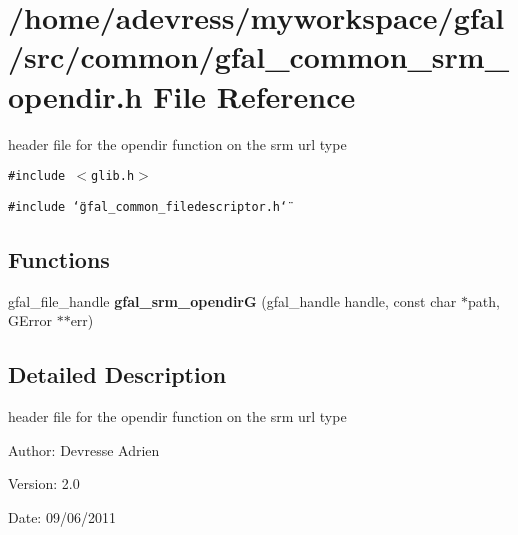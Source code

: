 \section{/home/adevress/myworkspace/gfal/src/common/gfal\_\-common\_\-srm\_\-opendir.h File Reference}
\label{gfal__common__srm__opendir_8h}
header file for the opendir function on the srm url type 

{\tt \#include $<$glib.h$>$}\par
{\tt \#include \char`\"{}gfal\_\-common\_\-filedescriptor.h\char`\"{}}\par
\subsection*{Functions}
\begin{CompactItemize}
\item 
gfal\_\-file\_\-handle \textbf{gfal\_\-srm\_\-opendir\-G} (gfal\_\-handle handle, const char $\ast$path, GError $\ast$$\ast$err)\label{gfal__common__srm__opendir_8h_3cf645c42428854975e385025b020285}

\end{CompactItemize}


\subsection{Detailed Description}
header file for the opendir function on the srm url type 

\begin{Desc}
\item[Author:]Devresse Adrien \end{Desc}
\begin{Desc}
\item[Version:]2.0 \end{Desc}
\begin{Desc}
\item[Date:]09/06/2011 \end{Desc}
